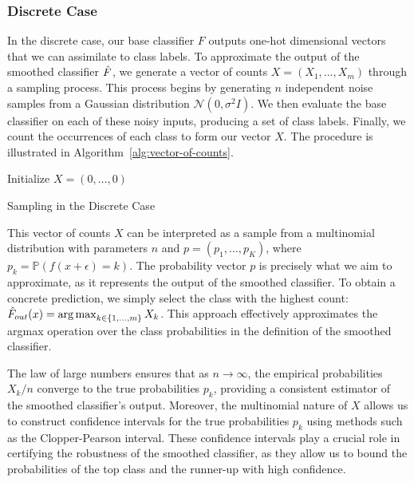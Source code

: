 \subsubsection{Discrete Case}\label{subsubsec:discrete-case-monte-carlo-simulation}
In the discrete case, our base classifier $F$ outputs one-hot dimensional vectors that we can assimilate to class labels.
To approximate the output of the smoothed classifier $\Hat{F}$, we generate a vector of counts $X = (X_1, \ldots, X_m)$ through a sampling process.
This process begins by generating $n$ independent noise samples from a Gaussian distribution $\mathcal{N}(0, \sigma^2 I)$.
We then evaluate the base classifier on each of these noisy inputs, producing a set of class labels.
Finally, we count the occurrences of each class to form our vector $X$.
The procedure is illustrated in Algorithm~\ref{alg:vector-of-counts}.
\begin{algorithm}[h]
    \DontPrintSemicolon %
    Initialize $X = (0, \ldots, 0)$\;
    \caption{Sampling in the Discrete Case}\label{alg:vector-of-counts}
\end{algorithm}

This vector of counts $X$ can be interpreted as a sample from a multinomial distribution with parameters $n$ and $p = (p_1, \ldots, p_K)$, where $p_k = \mathbb{P}(f(x + \epsilon) = k)$.
The probability vector $p$ is precisely what we aim to approximate, as it represents the output of the smoothed classifier.
To obtain a concrete prediction, we simply select the class with the highest count: $\hat{F}_{out}(x) = \operatorname*{arg\,max}_{k \in \{1, \ldots, m\}} X_k$.
This approach effectively approximates the argmax operation over the class probabilities in the definition of the smoothed classifier.

The law of large numbers ensures that as $n \rightarrow \infty$, the empirical probabilities $X_k / n$ converge to the true probabilities $p_k$, providing a consistent estimator of the smoothed classifier's output.
Moreover, the multinomial nature of $X$ allows us to construct confidence intervals for the true probabilities $p_k$ using methods such as the Clopper-Pearson interval.
These confidence intervals play a crucial role in certifying the robustness of the smoothed classifier, as they allow us to bound the probabilities of the top class and the runner-up with high confidence.

